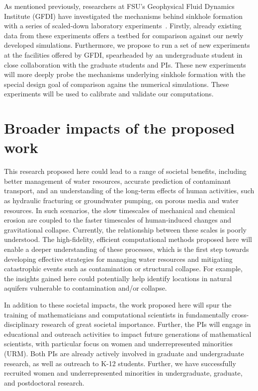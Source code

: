 \documentclass[11pt]{article}
\begin{document}
As mentioned previously, researchers at FSU's Geophysical Fluid Dynamics Institute (GFDI) have investigated the mechanisms behind sinkhole formation with a series of scaled-down laboratory experiments~\cite{tao2014experimental}. Firstly, already existing data from these experiments offers a testbed for comparison against our newly developed simulations. Furthermore, we propose to run a set of new experiments at the facilities offered by GFDI, spearheaded by an undergraduate student in close collaboration with the graduate students and PIs. These new experiments will more deeply probe the mechanisms underlying sinkhole formation with the special design goal of comparison agains the numerical simulations. These experiments will be used to calibrate and validate our computations.


\section{Broader impacts of the proposed work}

	This research proposed here could lead to a range of societal benefits, including better management of water resources, accurate prediction of contaminant transport, and an understanding of the long-term effects of human activities, such as hydraulic fracturing or groundwater pumping, on porous media and water resources. In such scenarios, the slow timescales of mechanical and chemical erosion are coupled to the faster timescales of human-induced changes and gravitational collapse. Currently, the relationship between these scales is poorly understood. The high-fidelity, efficient computational methods proposed here will enable a deeper understanding of these processes, which is the first step towards developing effective strategies for managing water resources and mitigating catastrophic events such as contamination or structural collapse. For example, the insights gained here could potentially help identify locations in natural aquifers vulnerable to contamination and/or collapse.

	In addition to these societal impacts, the work proposed here will spur the training of mathematicians and computational scientists in fundamentally cross-disciplinary research of great societal importance. Further, the PIs will engage in educational and outreach activities to impact future generations of mathematical scientists, with particular focus on women and underrepresented minorities (URM). 
Both PIs are already actively involved in graduate and undergraduate research, as well as outreach to K-12 students. Further, we have successfully recruited women and underrepresented minorities in undergraduate, graduate, and postdoctoral research.
\end{document}
